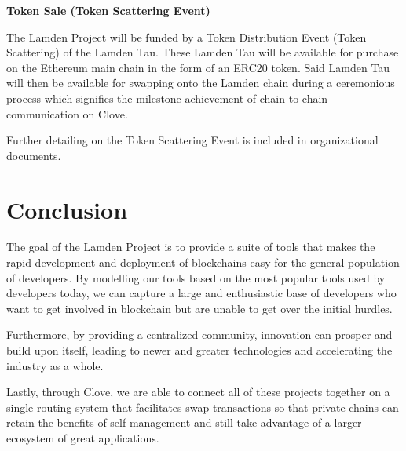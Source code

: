 \documentclass{%
	article}
\begin{document}
\begin{center}
\textbf{Token Sale (Token Scattering Event)}
\end{center}

The Lamden Project will be funded by a Token Distribution Event (Token Scattering) of the Lamden Tau. These Lamden Tau will be available for purchase on the Ethereum main chain in the form of an ERC20 token. Said Lamden Tau will then be available for swapping onto the Lamden chain during a ceremonious process which signifies the milestone achievement of chain-to-chain communication on Clove.

Further detailing on the Token Scattering Event is included in organizational documents.

\section{Conclusion}

The goal of the Lamden Project is to provide a suite of tools that makes the rapid development and deployment of blockchains easy for the general population of developers. By modelling our tools based on the most popular tools used by developers today, we can capture a large and enthusiastic base of developers who want to get involved in blockchain but are unable to get over the initial hurdles.

Furthermore, by providing a centralized community, innovation can prosper and build upon itself, leading to newer and greater technologies and accelerating the industry as a whole.

Lastly, through Clove, we are able to connect all of these projects together on a single routing system that facilitates swap transactions so that private chains can retain the benefits of self-management and still take advantage of a larger ecosystem of great applications.


{}

\end{document}
